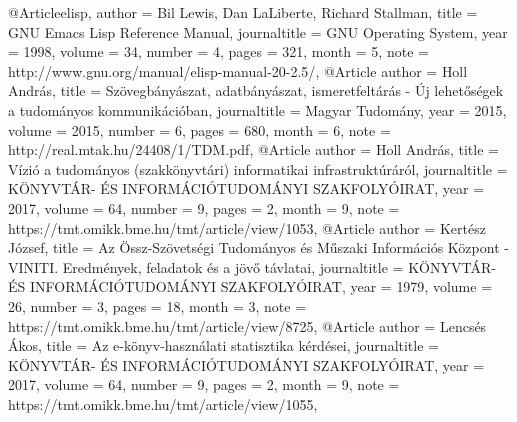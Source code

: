 @Article{elisp,
  author = {Bil Lewis, Dan LaLiberte, Richard Stallman},
  title = {GNU Emacs Lisp Reference Manual},
  journaltitle = {GNU Operating System},
  year = {1998},
  volume = {34},
  number = {4},
  pages = {321},
  month = {5},
  note = {http://www.gnu.org/manual/elisp-manual-20-2.5/},
}
@Article{
  author = {Holl András},
  title = {Szövegbányászat, adatbányászat, ismeretfeltárás - Új lehetőségek a tudományos kommunikációban},
  journaltitle = {Magyar Tudomány},
  year = {2015},
  volume = {2015},
  number = {6},
  pages = {680},
  month = {6},
  note = {http://real.mtak.hu/24408/1/TDM.pdf},
}
@Article{
  author = {Holl András},
  title = {Vízió a tudományos (szakkönyvtári) informatikai infrastruktúráról},
  journaltitle = {KÖNYVTÁR- ÉS INFORMÁCIÓTUDOMÁNYI SZAKFOLYÓIRAT},
  year = {2017},
  volume = {64},
  number = {9},
  pages = {2},
  month = {9},
  note = {https://tmt.omikk.bme.hu/tmt/article/view/1053},
}
@Article{
  author = {Kertész József},
  title = {Az Össz-Szövetségi Tudományos és Műszaki Információs Központ - VINITI. Eredmények, feladatok és a jövő távlatai},
  journaltitle = {KÖNYVTÁR- ÉS INFORMÁCIÓTUDOMÁNYI SZAKFOLYÓIRAT},
  year = {1979},
  volume = {26},
  number = {3},
  pages = {18},
  month = {3},
  note = {https://tmt.omikk.bme.hu/tmt/article/view/8725},
}
@Article{
  author = {Lencsés Ákos},
  title = {Az e-könyv-használati statisztika kérdései},
  journaltitle = {KÖNYVTÁR- ÉS INFORMÁCIÓTUDOMÁNYI SZAKFOLYÓIRAT},
  year = {2017},
  volume = {64},
  number = {9},
  pages = {2},
  month = {9},
  note = {https://tmt.omikk.bme.hu/tmt/article/view/1055},
}